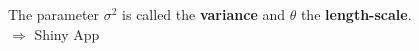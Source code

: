 \documentclass{beamer}
\newcommand\Ni[2]{{|| #1 ||}_{\! #2}}
\begin{document}
\begin{frame}{}
\vspace{2mm}
\normalsize
The parameter $\sigma^2$ is called the \textbf{variance} and $\theta$ the \textbf{length-scale}.\\
\alert{$\Rightarrow$ Shiny App}
\end{frame}

\end{document}
